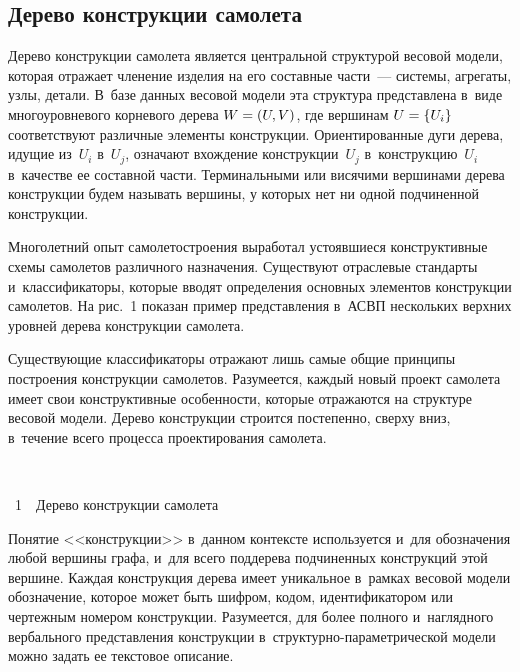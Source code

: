 \begin{multicols}{2}
  \subsection{Дерево конструкции самолета}

  Дерево конструкции самолета является центральной структурой весовой 
модели, которая отражает членение изделия на его составные части~--- 
системы, агрегаты, узлы, детали. В~базе данных весовой модели эта структура 
представлена в~виде многоуровневого корневого дерева $W \hm= (U, V)$, где 
вершинам $U \hm= \{U_i\}$ соответствуют различные\linebreak
 элементы конструкции. 
Ориентированные дуги дере\-ва, идущие из~$U_i$ в~$U_j$, означают вхождение 
конструкции~$U_j$ в~конструкцию~$U_i$ в~качестве ее составной части. 
Терминальными или висячими вершинами дерева конструкции будем называть 
вершины, у которых нет ни одной подчиненной конструкции.
  
  Многолетний опыт самолетостроения выработал устоявшиеся 
конструктивные схемы самолетов различного назначения. Существуют 
отраслевые стандарты и~классификаторы, которые вводят определения 
основных элементов конструкции самолетов. На рис.~1 показан пример 
представления в~АСВП нескольких верхних уровней дерева конструкции 
самолета. 


    

  Существующие классификаторы отражают лишь самые общие принципы 
построения конструкции самолетов. Разумеется, каждый новый проект 
самолета имеет свои конструктивные особенности, которые отражаются на 
структуре весовой модели. Дерево конструкции строится постепенно, сверху 
вниз, в~течение всего процесса проектирования самолета. 

 { \begin{center}  %
 \vspace*{9pt}
\mbox{%
 \epsfxsize=77.216mm 
 }

\vspace*{6pt}


\noindent
{{\figurename~1}\ \ \small{Дерево конструкции самолета}}
\end{center}
}

\addtocounter{figure}{1}
  
  Понятие <<конструкции>> в~данном контексте используется и~для 
обозначения любой вершины графа, и~для всего поддерева подчиненных 
конструкций этой вершине. Каждая конструкция дерева имеет уникальное 
в~рамках весовой модели обозначение, которое может быть шифром, кодом, 
идентификатором или чертежным номером конструкции. Разумеется, для более 
полного и~наглядного вербального представления конструкции  
в~струк\-тур\-но-па\-ра\-мет\-ри\-че\-ской модели можно задать ее текстовое 
описание.
  

\end{multicols}
